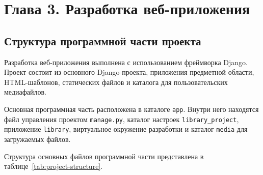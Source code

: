 \section*{Глава 3. Разработка веб-приложения}

\subsection{Структура программной части проекта}

Разработка веб-приложения выполнена с использованием фреймворка Django. Проект состоит из основного Django-проекта, приложения предметной области, HTML-шаблонов, статических файлов и каталога для пользовательских медиафайлов.

Основная программная часть расположена в каталоге \texttt{app}. Внутри него находятся файл управления проектом \texttt{manage.py}, каталог настроек \texttt{library\_project}, приложение \texttt{library}, виртуальное окружение разработки и каталог \texttt{media} для загружаемых файлов.

Структура основных файлов программной части представлена в таблице~\ref{tab:project-structure}.

